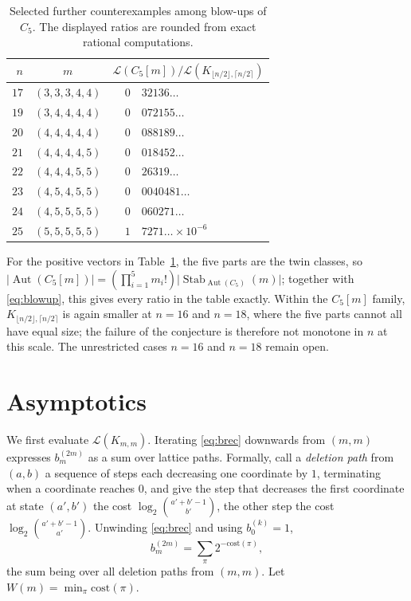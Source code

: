 \documentclass[11pt]{article}
\theoremstyle{definition}
\DeclareMathOperator{\Aut}{Aut}
\newcommand{\Lk}{\mathcal{L}}
\newcommand{\bin}[2]{\binom{#1}{#2}}
\newcommand{\Kbal}{K_{\lfloor n/2\rfloor,\lceil n/2\rceil}}
\begin{document}
\begin{table}[htbp]
\centering
\begin{tabular}{@{}rcr@{.}l@{}}
\toprule
$n$ & $m$ & \multicolumn{2}{c}{$\Lk(C_5[m])/\Lk(\Kbal)$}\\
\midrule
$17$ & $(3,3,3,4,4)$ & $0$ & $32136\ldots$\\
$19$ & $(3,4,4,4,4)$ & $0$ & $072155\ldots$\\
$20$ & $(4,4,4,4,4)$ & $0$ & $088189\ldots$\\
$21$ & $(4,4,4,4,5)$ & $0$ & $018452\ldots$\\
$22$ & $(4,4,4,5,5)$ & $0$ & $26319\ldots$\\
$23$ & $(4,5,4,5,5)$ & $0$ & $0040481\ldots$\\
$24$ & $(4,5,5,5,5)$ & $0$ & $060271\ldots$\\
$25$ & $(5,5,5,5,5)$ & $1$ & $7271\ldots\times 10^{-6}$\\
\bottomrule
\end{tabular}
\caption{Selected further counterexamples among blow-ups of $C_5$. The
displayed ratios are rounded from exact rational computations.}
\label{tab:c5more}
\end{table}

For the positive vectors in Table~\ref{tab:c5more}, the five parts are the
twin classes, so $\lvert\Aut(C_5[m])\rvert=(\prod_{i=1}^5m_i!)
\lvert\operatorname{Stab}_{\Aut(C_5)}(m)\rvert$; together with \eqref{eq:blowup}, this
gives every ratio in the table exactly.
Within the $C_5[m]$ family, $\Kbal$ is again smaller at $n=16$ and $n=18$,
where the five parts cannot all have equal size; the failure of the conjecture
is therefore not monotone in $n$ at this scale. The unrestricted cases
$n=16$ and $n=18$ remain open.

\section{Asymptotics}\label{sec:asym}

We first evaluate $\Lk(K_{m,m})$. Iterating \eqref{eq:brec} downwards from $(m,m)$ expresses $b^{(2m)}_m$ as a sum over lattice paths. Formally, call a \emph{deletion path} from $(a,b)$ a sequence of steps each decreasing one coordinate by $1$, terminating when a coordinate reaches $0$, and give the step that decreases the first coordinate at state $(a',b')$ the cost $\log_2\bin{a'+b'-1}{b'}$, the other step the cost $\log_2\bin{a'+b'-1}{a'}$. Unwinding \eqref{eq:brec} and using $b^{(k)}_0=1$,
\begin{equation}\label{eq:pathsum}
b^{(2m)}_m=\sum_{\pi}2^{-\mathrm{cost}(\pi)},
\end{equation}
the sum being over all deletion paths from $(m,m)$. Let $W(m)=\min_\pi \mathrm{cost}(\pi)$.
\end{document}
